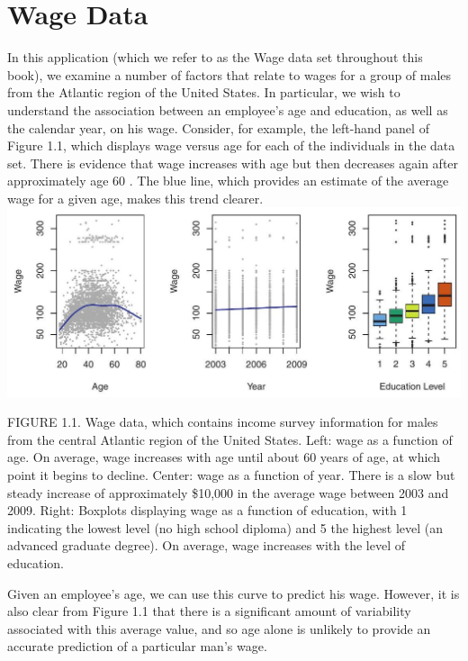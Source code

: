 \documentclass[10pt]{article}
\begin{document}
\section*{Wage Data}
In this application (which we refer to as the Wage data set throughout this book), we examine a number of factors that relate to wages for a group of males from the Atlantic region of the United States. In particular, we wish to understand the association between an employee's age and education, as well as the calendar year, on his wage. Consider, for example, the left-hand panel of Figure 1.1, which displays wage versus age for each of the individuals in the data set. There is evidence that wage increases with age but then decreases again after approximately age 60 . The blue line, which provides an estimate of the average wage for a given age, makes this trend clearer.\\
\includegraphics[max width=\textwidth, center]{2025_05_05_efe77898333945044de4g-017}

FIGURE 1.1. Wage data, which contains income survey information for males from the central Atlantic region of the United States. Left: wage as a function of age. On average, wage increases with age until about 60 years of age, at which point it begins to decline. Center: wage as a function of year. There is a slow but steady increase of approximately \$10,000 in the average wage between 2003 and 2009. Right: Boxplots displaying wage as a function of education, with 1 indicating the lowest level (no high school diploma) and 5 the highest level (an advanced graduate degree). On average, wage increases with the level of education.

Given an employee's age, we can use this curve to predict his wage. However, it is also clear from Figure 1.1 that there is a significant amount of variability associated with this average value, and so age alone is unlikely to provide an accurate prediction of a particular man's wage.
\end{document}
